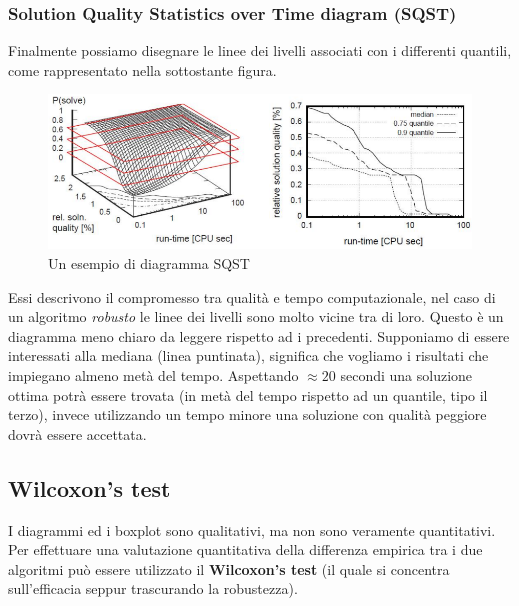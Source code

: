 \documentclass{article}
\begin{document}
\subsubsection{Solution Quality Statistics over Time diagram (SQST)}
Finalmente possiamo disegnare le linee dei livelli associati con i differenti quantili, come
rappresentato nella sottostante figura.
\begin{figure}[H]
    \centering
    \includegraphics[scale=0.5]{images/sqst.png}
    \caption{Un esempio di diagramma SQST}
\end{figure}
Essi descrivono il compromesso tra qualità e tempo computazionale, nel caso di un algoritmo
\textit{robusto} le linee dei livelli sono molto vicine tra di loro. Questo è un diagramma
meno chiaro da leggere rispetto ad i precedenti. Supponiamo di essere interessati alla mediana
(linea puntinata), significa che vogliamo i risultati che impiegano almeno metà del tempo. Aspettando
$\approx20$ secondi una soluzione ottima potrà essere trovata (in metà del tempo rispetto ad un
quantile, tipo il terzo), invece
utilizzando un tempo minore una soluzione con qualità peggiore dovrà essere accettata.

\subsection{Wilcoxon's test}
I diagrammi ed i boxplot sono qualitativi, ma non sono veramente quantitativi. Per effettuare
una valutazione quantitativa della differenza empirica tra i due algoritmi può essere utilizzato
il \textbf{Wilcoxon's test} (il quale si concentra sull'efficacia seppur trascurando la robustezza).
\end{document}
